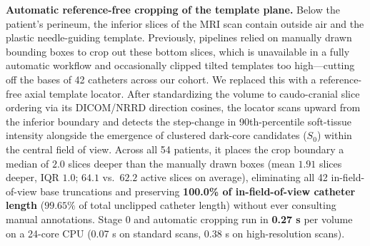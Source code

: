 \documentclass[
  11pt,
]{article}
\begin{document}
\textbf{Automatic reference-free cropping of the template plane.} Below
the patient's perineum, the inferior slices of the MRI scan contain
outside air and the plastic needle-guiding template. Previously,
pipelines relied on manually drawn bounding boxes to crop out these
bottom slices, which is unavailable in a fully automatic workflow and
occasionally clipped tilted templates too high---cutting off the bases
of 42 catheters across our cohort. We replaced this with a
reference-free axial template locator. After standardizing the volume to
caudo-cranial slice ordering via its DICOM/NRRD direction cosines, the
locator scans upward from the inferior boundary and detects the
step-change in 90th-percentile soft-tissue intensity alongside the
emergence of clustered dark-core candidates (\(S_0\)) within the central
field of view. Across all 54 patients, it places the crop boundary a
median of \(2.0\) slices deeper than the manually drawn boxes (mean
\(1.91\) slices deeper, IQR \(1.0\); \(64.1\) vs.~\(62.2\) active slices
on average), eliminating all 42 in-field-of-view base truncations and
preserving \textbf{100.0\% of in-field-of-view catheter length}
(\(99.65\%\) of total unclipped catheter length) without ever consulting
manual annotations. Stage 0 and automatic cropping run in \textbf{0.27
s} per volume on a 24-core CPU (0.07 s on standard scans, 0.38 s on
high-resolution scans).
\end{document}
